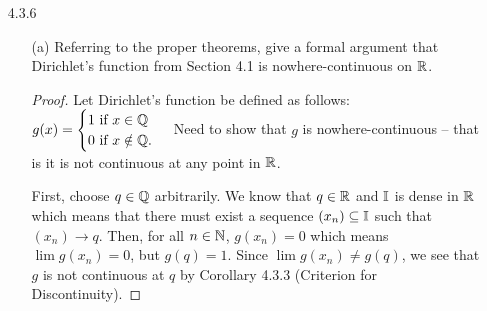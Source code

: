 \documentclass[12pt,letterpaper]{article}
\begin{document}
\begin{itemize}[leftmargin=!,labelindent=5pt]
\begin{itemize}
\begin{proof}
                        So, any function $f$ with domain $\bbZ$ will necessarily be continuous at every point in $\bbZ$.
                    \end{proof}
                \item [(b)] Show in general that if $c$ is an isolated point of $A \subseteq \bbR$, then $f : A \to \bbR$ is continuous at $c$.
                    \begin{proof}
                        Assume $c$ is an isolated point of $A \subseteq \bbR$.
                        Need to show that $f : A \to \bbR$ is continuous at $c$, that is for all $V_\epsilon(f(c))$, there exists a $V_\delta(c)$ with the property that $x \in V_\delta(c)$ (and $x \in A$) implies $f(x) \in V_\epsilon(f(c))$.
                        Suppose $\epsilon > 0$ is arbitrary.
                        Since $c$ is an isolated point, we know from the inverse of Definition 3.2.4 that there exists a $\delta$ neighborhood $V_\delta(c)$ that intersects $A$ only at the point $c$, so $V_\delta(c) \cap A = c$.
                        Then, for all $x \in V_\delta(c)$, $x = c$ which means that $f(x) = f(c)$.
                        So, $f(x) \in V_\epsilon(f(c))$.
                        Thus, $f(x)$ is continuous at $c$ by Theorem 4.3.2 (iii).
                    \end{proof}
            \end{itemize}
        \item [4.3.6] 
            \begin{itemize}
                \item [(a)] Referring to the proper theorems, give a formal argument that Dirichlet’s function from Section 4.1 is nowhere-continuous on $\mathbb{R}$.
                    \begin{proof}
                        Let Dirichlet’s function be defined as follows:
                        \(
                            g(x) = 
                            \begin{cases}
                                1 \text{ if } x \in \mathbb{Q} \\
                                0 \text{ if } x \notin \mathbb{Q}.
                            \end{cases}
                        \)
                        Need to show that $g$ is nowhere-continuous -- that is it is not continuous at any point in $\mathbb{R}$.

                        First, choose $q\in\mathbb{Q}$ arbitrarily.
                        We know that $q \in \mathbb{R}$ and $\mathbb{I}$ is dense in $\mathbb{R}$ which means that there must exist a sequence $(x_n) \subseteq \mathbb{I}$ such that $(x_n) \to q$.
                        Then, for all $n \in \mathbb{N}$, $g(x_n) = 0$ which means $\lim g(x_n) = 0$, but $g(q) = 1$.
                        Since $\lim g(x_n) \neq g(q)$, we see that $g$ is not continuous at $q$ by Corollary 4.3.3 (Criterion for Discontinuity).


\end{proof}
\end{itemize}
\end{itemize}
\end{document}

